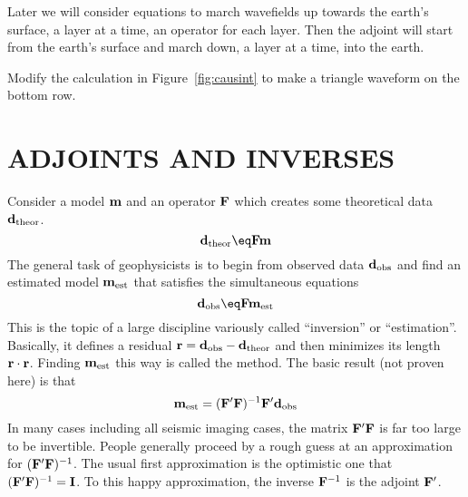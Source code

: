 \par
Later we will consider equations
to march wavefields up towards the earth's surface,
a layer at a time, an operator for each layer.
Then the adjoint will start from the earth's surface
and march down, a layer at a time, into the earth.
\begin{exer}
\item
Modify the calculation in Figure~\ref{fig:causint} to make
a triangle waveform on the bottom row.
\end{exer}


\section{ADJOINTS AND INVERSES}

Consider a model $\bold m$ and an operator $\bold F$ which creates some
theoretical data $\bold d_{\rm theor}$.
\begin{equation}
	\bold d_{\rm theor} \eq \bold F \bold m
\end{equation}
The general task of geophysicists is to begin from
observed data $\bold d_{\rm obs}$ and
find an estimated model $\bold m_{\rm est}$
that satisfies the simultaneous equations
\begin{equation}
	\bold d_{\rm obs} \eq \bold F \bold m_{\rm est}
\end{equation}
This is the topic of a large discipline variously called
``inversion'' or ``estimation''.
Basically, it defines a residual
$\bold r = \bold d_{\rm obs}-\bold d_{\rm theor}$
and then minimizes its length $\bold r \cdot \bold r$.
Finding $\bold m_{\rm est}$ this way is called
the  method.
The basic result (not proven here) is that
\begin{equation}
\bold m_{\rm est} = (\bold F'\bold F)^{-1}\bold F'\bold d_{\rm obs}
\end{equation}
In many cases including all seismic imaging cases,
the matrix
$\bold F'\bold F$
is far too large to be invertible.
People generally proceed by a rough guess at an approximation
for $(\bold F'\bold F)^{-1}$.
The usual first approximation is
the optimistic one that $(\bold F'\bold F)^{-1}=\bold I$.
To this happy approximation, the inverse $\bold F^{-1}$
is the adjoint $\bold F'$.

